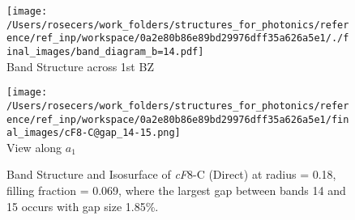 \begin{figure}[H]
\begin{minipage}{0.5\textwidth}\centering
\texttt{[image: /Users/rosecers/work\_folders/structures\_for\_photonics/reference/ref\_inp/workspace/0a2e80b86e89bd29976dff35a626a5e1/./final\_images/band\_diagram\_b=14.pdf]}
\\Band Structure across 1st BZ
\end{minipage}\hfill
\begin{minipage}{0.48\textwidth}\centering
\texttt{[image: /Users/rosecers/work\_folders/structures\_for\_photonics/reference/ref\_inp/workspace/0a2e80b86e89bd29976dff35a626a5e1/final\_images/cF8-C@gap\_14-15.png]}
\\View along $a_1$ 
\end{minipage}\hfill\caption{Band Structure and Isosurface of \textit{cF}8-C (Direct) at radius = 0.18, filling fraction = 0.069, where the largest gap between bands 14 and 15 occurs with gap size 1.85\%.}

\end{figure}
\vspace{-0.25in}

